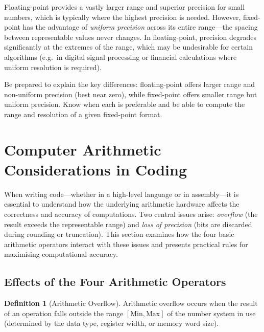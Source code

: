 \documentclass[11pt, a4paper, notitlepage]{report}
\theoremstyle{definition}
\newtheorem{definition}[theorem]{Definition}
\theoremstyle{remark}
\theoremstyle{definition}
\begin{document}
Floating-point provides a vastly larger range and superior precision for small numbers, which is typically where the highest precision is needed. However, fixed-point has the advantage of \emph{uniform precision} across its entire range---the spacing between representable values never changes. In floating-point, precision degrades significantly at the extremes of the range, which may be undesirable for certain algorithms (e.g.\ in digital signal processing or financial calculations where uniform resolution is required).

\begin{examtip}[title={Exam Tip: Fixed vs.\ Floating-Point Trade-offs}]
  Be prepared to explain the key differences: floating-point offers larger range and non-uniform precision (best near zero), while fixed-point offers smaller range but uniform precision. Know when each is preferable and be able to compute the range and resolution of a given fixed-point format.
\end{examtip}

\section{Computer Arithmetic Considerations in Coding}
\label{sec:arith-coding}

When writing code---whether in a high-level language or in assembly---it is essential to understand how the underlying arithmetic hardware affects the correctness and accuracy of computations. Two central issues arise: \emph{overflow} (the result exceeds the representable range) and \emph{loss of precision} (bits are discarded during rounding or truncation). This section examines how the four basic arithmetic operators interact with these issues and presents practical rules for maximising computational accuracy.

\subsection{Effects of the Four Arithmetic Operators}
\label{sec:operator-effects}

\begin{definition}[Arithmetic Overflow]
  \label{def:arith-overflow-coding}
  Arithmetic overflow occurs when the result of an operation falls outside the range $[\text{Min}, \text{Max}]$ of the number system in use (determined by the data type, register width, or memory word size).
\end{definition}
\end{document}
